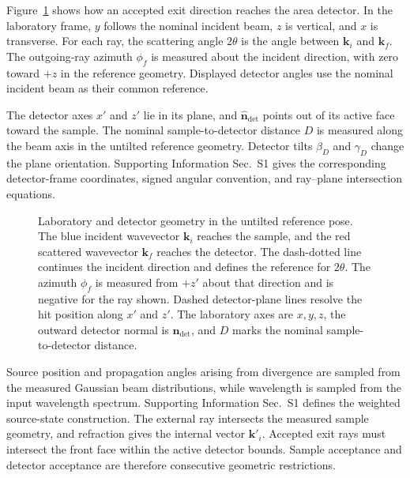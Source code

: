 Figure~\ref{fig:waxs_geometry_system} shows how an accepted exit direction reaches the area detector. In the laboratory frame, $y$ follows the nominal incident beam, $z$ is vertical, and $x$ is transverse. For each ray, the scattering angle $2\theta$ is the angle between $\mathbf{k}_i$ and $\mathbf{k}_f$. The outgoing-ray azimuth $\phi_f$ is measured about the incident direction, with zero toward $+z$ in the reference geometry. Displayed detector angles use the nominal incident beam as their common reference.

The detector axes $x'$ and $z'$ lie in its plane, and $\hat{\mathbf n}_{\mathrm{det}}$ points out of its active face toward the sample. The nominal sample-to-detector distance $D$ is measured along the beam axis in the untilted reference geometry. Detector tilts $\beta_D$ and $\gamma_D$ change the plane orientation. Supporting Information Sec.~S1 gives the corresponding detector-frame coordinates, signed angular convention, and ray--plane intersection equations.

\begin{figure}[H]
  \centering
  \resizebox{0.6\linewidth}{!}{}
  \caption{Laboratory and detector geometry in the untilted reference pose. The blue incident wavevector $\mathbf{k}_i$ reaches the sample, and the red scattered wavevector $\mathbf{k}_f$ reaches the detector. The dash-dotted line continues the incident direction and defines the reference for $2\theta$. The azimuth $\phi_f$ is measured from $+z'$ about that direction and is negative for the ray shown. Dashed detector-plane lines resolve the hit position along $x'$ and $z'$. The laboratory axes are $x,y,z$, the outward detector normal is $\hat{\mathbf n}_{\mathrm{det}}$, and $D$ marks the nominal sample-to-detector distance.}
  \label{fig:waxs_geometry_system}
\end{figure}

\begingroup
{}
Source position and propagation angles arising from divergence are sampled from the measured Gaussian beam distributions, while wavelength is sampled from the input wavelength spectrum. Supporting Information Sec.~S1 defines the weighted source-state construction. The external ray intersects the measured sample geometry, and refraction gives the internal vector $\mathbf{k}'_i$. Accepted exit rays must intersect the front face within the active detector bounds. Sample acceptance and detector acceptance are therefore consecutive geometric restrictions.
\par\endgroup


